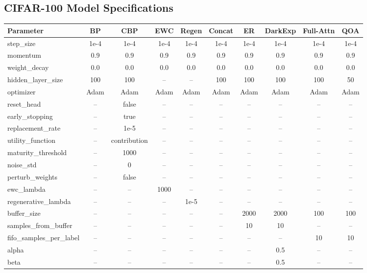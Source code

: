 \documentclass{article}
\begin{document}
\subsection{CIFAR-100 Model Specifications}
\label{sec:cifar_model_specs}

\vspace{2mm}
\noindent
\begin{minipage}{\columnwidth}
\centering
\footnotesize
\setlength{\tabcolsep}{3pt}

\begin{tabular}{lccccccccc}
\toprule
\textbf{Parameter} & \textbf{BP} & \textbf{CBP} & \textbf{EWC} & \textbf{Regen} & \textbf{Concat} & \textbf{ER} & \textbf{DarkExp} & \textbf{Full-Attn} & \textbf{QOA} \\
\midrule
step\_size          & 1e-4 & 1e-4 & 1e-4 & 1e-4 & 1e-4 & 1e-4 & 1e-4 & 1e-4 & 1e-4 \\
momentum            & 0.9  & 0.9  & 0.9  & 0.9  & 0.9  & 0.9  & 0.9  & 0.9  & 0.9  \\
weight\_decay       & 0.0  & 0.0  & 0.0  & 0.0  & 0.0  & 0.0  & 0.0  & 0.0  & 0.0  \\
hidden\_layer\_size & 100  & 100  & --   & --   & 100  & 100  & 100  & 100  & 50   \\
optimizer              & Adam & Adam & Adam & Adam & Adam & Adam & Adam & Adam & Adam \\
\midrule
reset\_head         & --   & false & --  & --   & --   & --   & --   & --   & --   \\
early\_stopping     & --   & true  & --  & --   & --   & --   & --   & --   & --   \\
replacement\_rate   & --   & 1e-5  & --  & --   & --   & --   & --   & --   & --   \\
utility\_function   & --   & contribution & -- & -- & -- & -- & -- & -- & -- \\
maturity\_threshold & --   & 1000  & --  & --   & --   & --   & --   & --   & --   \\
noise\_std          & --   & 0     & --  & --   & --   & --   & --   & --   & --   \\
perturb\_weights    & --   & false & --  & --   & --   & --   & --   & --   & --   \\
\midrule
ewc\_lambda         & --   & --    & 1000 & --  & --   & --   & --   & --   & --   \\
regenerative\_lambda& --   & --    & --   & 1e-5 & --  & --   & --   & --   & --   \\
\midrule
buffer\_size        & --   & --    & --   & --   & --   & 2000 & 2000 & 100  & 100  \\
samples\_from\_buffer & -- & --    & --   & --   & --   & 10   & 10   & --   & --   \\
fifo\_samples\_per\_label & -- & -- & --  & --   & --   & --   & --   & 10   & 10   \\
\midrule
alpha               & --   & --    & --   & --   & --   & --   & 0.5  & --   & --   \\
beta                & --   & --    & --   & --   & --   & --   & 0.5  & --   & --   \\
\bottomrule
\end{tabular}


\end{minipage}
\end{document}
